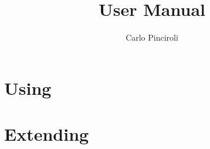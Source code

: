 \documentclass{book}
\title{\argos User Manual}
\author{Carlo Pinciroli}
\begin{document}
\maketitle
\tableofcontents

\part{Using \argos}





\part{Extending \argos}




\end{document}
